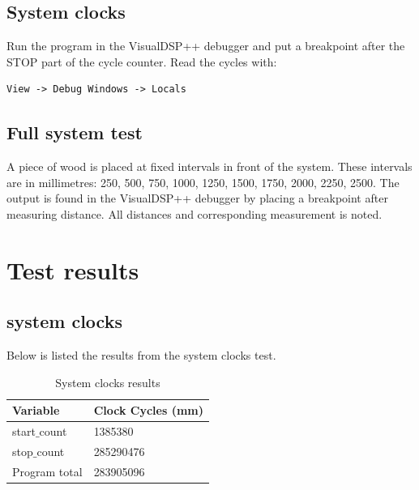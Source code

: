 \subsection{System clocks}
Run the program in the VisualDSP++ debugger and put a breakpoint after the STOP part of the cycle counter. Read the cycles with:
\begin{verbatim}
View -> Debug Windows -> Locals
\end{verbatim}
\subsection{Full system test}
A piece of wood is placed at fixed intervals in front of the system. These intervals are in millimetres: 250, 500, 750, 1000, 1250, 1500, 1750, 2000, 2250, 2500. The output is found in the VisualDSP++ debugger by placing a breakpoint after measuring distance. All distances and corresponding measurement is noted.
\section{Test results}
\subsection{system clocks}
Below is listed the results from the system clocks test.
\begin{table}[H]
\centering
    \begin{tabular}{|l|l|}
    \hline
    Variable           & Clock Cycles (mm) \\ \hline
    start$\_$count        & 1385380           \\ \hline
    stop$\_$count         & 285290476         \\ \hline
    Program total      & 283905096         \\ \hline
    \end{tabular}
    \caption{System clocks results}
\end{table}
